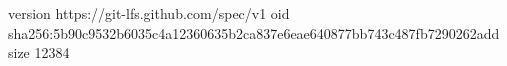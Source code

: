 version https://git-lfs.github.com/spec/v1
oid sha256:5b90c9532b6035c4a12360635b2ca837e6eae640877bb743c487fb7290262add
size 12384
